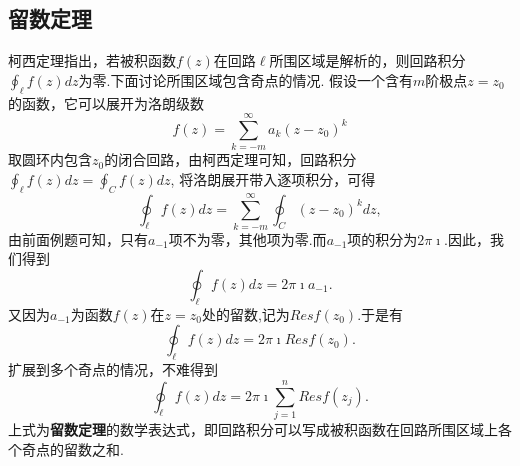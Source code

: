 \subsection{留数定理}
\label{subsec:residual_theorem}
柯西定理指出，若被积函数$f(z)$在回路$\ell$所围区域是解析的，则回路积分$\oint_\ell f(z) dz$为零.下面讨论所围区域包含奇点的情况.
假设一个含有$m$阶极点$z=z_0$的函数，它可以展开为洛朗级数
\[
  f(z) = \sum_{k = -m} ^{\infty} a_k (z - z_0)^k  
\]
取圆环内包含$z_0$的闭合回路，由柯西定理可知，回路积分$\oint_\ell f(z) dz = \oint_C f(z) dz$, 将洛朗展开带入逐项积分，可得
\[
\oint_\ell f(z) dz = \sum_{k = -m} ^{\infty} \oint_C  (z - z_0)^k dz,
\]
由前面例题可知，只有$a_{-1}$项不为零，其他项为零.而$a_{-1}$项的积分为$2\pi\imath$.因此，我们得到
\begin{equation}
    \oint_\ell f(z) dz = 2\pi \imath a_{-1} .
\end{equation}
又因为$a_{-1}$为函数$f(z)$在$z=z_0$处的留数,记为$Res f(z_0)$.于是有
\begin{equation}
    \oint_\ell f(z) dz = 2\pi \imath Res f(z_0) .
\end{equation}
扩展到多个奇点的情况，不难得到
\begin{equation}
    \oint_\ell f(z) dz = 2\pi \imath \sum_{j=1}^{n} Res f(z_j) .
\end{equation}
上式为\textbf{留数定理}的数学表达式，即回路积分可以写成被积函数在回路所围区域上各个奇点的留数之和.

